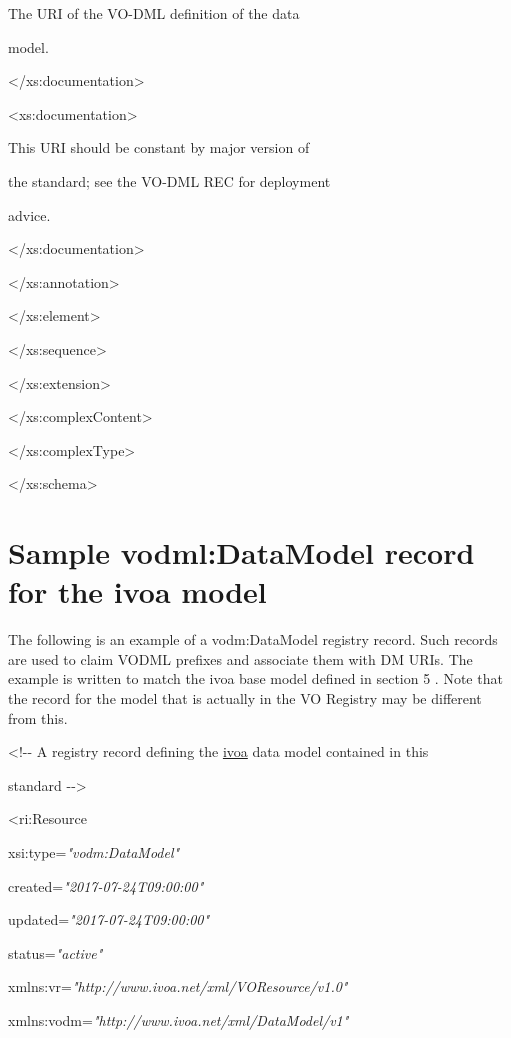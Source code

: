 \documentclass[10pt,a4paper]{ivoa}
\begin{document}
The URI of the VO-DML definition of the data

model.

\textless/xs:documentation\textgreater{}

\textless xs:documentation\textgreater{}

This URI should be constant by major version of

the standard; see the VO-DML REC for deployment

advice.

\textless/xs:documentation\textgreater{}

\textless/xs:annotation\textgreater{}

\textless/xs:element\textgreater{}

\textless/xs:sequence\textgreater{}

\textless/xs:extension\textgreater{}

\textless/xs:complexContent\textgreater{}

\textless/xs:complexType\textgreater{}

\textless/xs:schema\textgreater{}

\hypertarget{sample-vodmldatamodel-record-for-the-ivoa-model}{%
\section{Sample vodml:DataModel record for the ivoa
model}\label{sample-vodmldatamodel-record-for-the-ivoa-model}}

The following is an example of a vodm:DataModel registry record. Such
records are used to claim VODML prefixes and associate them with DM
URIs. The example is written to match the ivoa base model defined in
section 5 . Note that the record for the model that is actually in the
VO Registry may be different from this.

\textless!-\/- A registry record defining the \uline{ivoa} data model
contained in this

standard -\/-\textgreater{}

\textless ri:Resource

xsi:type=\emph{"vodm:DataModel"}

created=\emph{"2017-07-24T09:00:00"}

updated=\emph{"2017-07-24T09:00:00"}

status=\emph{"active"}

xmlns:vr=\emph{"http://www.ivoa.net/xml/VOResource/v1.0"}

xmlns:vodm=\emph{"http://www.ivoa.net/xml/DataModel/v1"}
\end{document}
